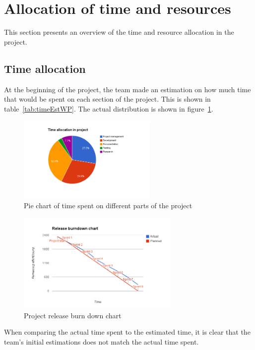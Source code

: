 \section{Allocation of time and resources}
\label{sec:timeSpent}
This section presents an overview of the time and resource allocation in the project.

\subsection{Time allocation}
At the beginning of the project, the team made an estimation on how much time that would be spent on each section of the project. This is shown in table~\ref{tab:timeEstWP}. The actual distribution is shown in figure~\ref{fig:piechart}.

\begin{figure}[H]
\centering
\includegraphics[width=0.6\textwidth, clip, trim=4cm 2cm 4cm 1cm]{ch/retrospect/fig/timePie.png}
\caption{Pie chart of time spent on different parts of the project}
\label{fig:piechart}
\end{figure}

\begin{figure}[H]
\centering
\includegraphics[width=0.7\textwidth, clip, trim=1.1cm 0.5cm 1.2cm 1cm]{ch/retrospect/fig/release.png}
\caption{Project release burn down chart}
\label{fig:release}
\end{figure}

When comparing the actual time spent to the estimated time, it is clear that the team's initial estimations does not match the actual time spent.

